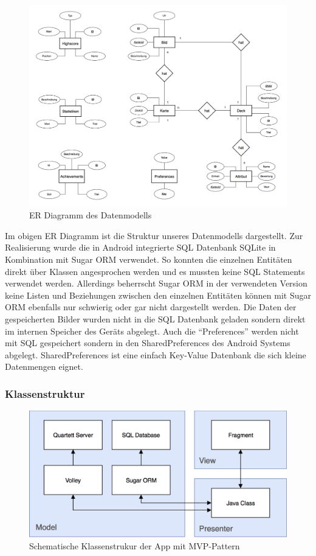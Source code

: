 \documentclass{scrartcl}
\begin{document}
\begin{figure}[h]
  \centering
  \includegraphics[width=\textwidth]{img/map_er.png}
  \caption{ER Diagramm des Datenmodells}
\end{figure}

\noindent
Im obigen ER Diagramm ist die Struktur unseres Datenmodells dargestellt. Zur
Realisierung wurde die in Android integrierte SQL Datenbank SQLite in
Kombination mit Sugar ORM verwendet. So konnten die einzelnen Entitäten direkt
über Klassen angesprochen werden und es mussten keine SQL Statements verwendet
werden. Allerdings beherrscht Sugar ORM in der verwendeten Version keine Listen
und Beziehungen zwischen den einzelnen Entitäten können mit Sugar ORM ebenfalls
nur schwierig oder gar nicht dargestellt werden. Die Daten der gespeicherten
Bilder wurden nicht in die SQL Datenbank geladen sondern direkt im internen
Speicher des Geräts abgelegt. Auch die \enquote{Preferences} werden nicht mit
SQL gespeichert sondern in den SharedPreferences des Android Systems abgelegt.
SharedPreferences ist eine einfach Key-Value Datenbank die sich kleine
Datenmengen eignet.

\subsubsection{Klassenstruktur}

\begin{figure}[!ht]
  \centering
  \includegraphics[width=\textwidth]{img/class_structure.png}
  \caption{Schematische Klassenstrukur der App mit MVP-Pattern}
\end{figure}
\end{document}
